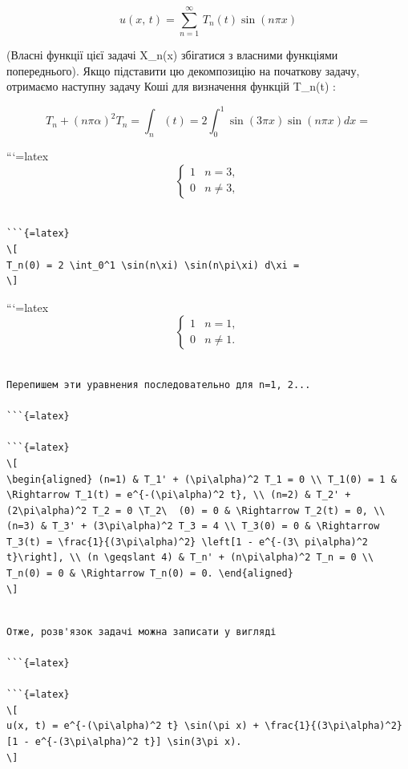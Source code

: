 \documentclass[
]{article}
\begin{document}
\[
u\left(x,\,t\right)=\sum_{n=1}^{\infty}\,T_{n}\left(t\right)\sin\left(n\pi x\right)
\]

(Власні функції цієї задачі X\_n(x) збігатися з власними функціями
попереднього). Якщо підставити цю декомпозицію на початкову задачу,
отримаємо наступну задачу Коші для визначення функцій T\_n(t) :

\[
T_n + (n\pi\alpha)^2 T_n = \int_n (t) = 2 \int_0^1 \sin(3\pi x) \sin(n\pi x) dx =
\]

```{=latex}
\[
\begin{cases} 1 &n = 3, \\ 0 & n \neq 3, \end{cases}
\]

\begin{verbatim}

```{=latex}
\[
T_n(0) = 2 \int_0^1 \sin(n\xi) \sin(n\pi\xi) d\xi =
\]
\end{verbatim}

```{=latex}
\[
\begin{cases} 1 &n = 1, \\ 0 & n \neq 1. \end{cases}
\]

\begin{verbatim}

Перепишем эти уравнения последовательно для n=1, 2...

```{=latex}

```{=latex}
\[
\begin{aligned} (n=1) & T_1' + (\pi\alpha)^2 T_1 = 0 \\ T_1(0) = 1 & \Rightarrow T_1(t) = e^{-(\pi\alpha)^2 t}, \\ (n=2) & T_2' + (2\pi\alpha)^2 T_2 = 0 \T_2\  (0) = 0 & \Rightarrow T_2(t) = 0, \\ (n=3) & T_3' + (3\pi\alpha)^2 T_3 = 4 \\ T_3(0) = 0 & \Rightarrow T_3(t) = \frac{1}{(3\pi\alpha)^2} \left[1 - e^{-(3\ pi\alpha)^2 t}\right], \\ (n \geqslant 4) & T_n' + (n\pi\alpha)^2 T_n = 0 \\ T_n(0) = 0 & \Rightarrow T_n(0) = 0. \end{aligned}
\]
\end{verbatim}

\begin{verbatim}

Отже, розв'язок задачі можна записати у вигляді

```{=latex}

```{=latex}
\[
u(x, t) = e^{-(\pi\alpha)^2 t} \sin(\pi x) + \frac{1}{(3\pi\alpha)^2} [1 - e^{-(3\pi\alpha)^2 t}] \sin(3\pi x).
\]
\end{verbatim}
\end{document}
